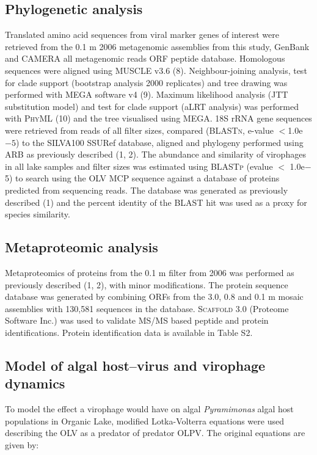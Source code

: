 \subsection{Phylogenetic analysis}
Translated amino acid sequences from viral marker genes of interest were retrieved from the 0.1 \textmu{}m 2006 metagenomic assemblies from this study, GenBank and \ac{CAMERA} all metagenomic reads \ac{ORF} peptide database. 
Homologous sequences were aligned using \textsc{MUSCLE} v3.6 (8). 
Neighbour-joining analysis, test for clade support (bootstrap analysis 2000 replicates) and tree drawing was performed with \ac{MEGA} software v4 (9). 
Maximum likelihood analysis (\textsc{JTT} substitution model) and test for clade support (aLRT analysis) was performed with \textsc{PhyML} (10) and the tree visualised using \ac{MEGA}. 
18S \ac{rRNA} gene sequences were retrieved from reads of all filter sizes, compared (\textsc{BLASTn}, e-value $<$1.0e$-5$) to the \textsc{SILVA100} SSURef database, aligned and phylogeny performed using \textsc{ARB} as previously described (1, 2). 
The abundance and similarity of virophages in all lake samples and filter sizes was estimated using \textsc{BLASTp} (evalue $<$ 1.0e$-$5) to search using the \ac{OLV} \ac{MCP} sequence against a database of proteins predicted from sequencing reads. 
The database was generated as previously described (1) and the percent identity of the \textsc{BLAST} hit was used as a proxy for species similarity. 

\subsection{Metaproteomic analysis}
Metaproteomics of proteins from the 0.1 \textmu{}m filter from 2006 was performed as previously described (1, 2), with minor modifications. 
The protein sequence database was generated by combining ORFs from the 3.0, 0.8 and 0.1 \textmu{}m mosaic assemblies with 130,581 sequences in the database. 
\textsc{Scaffold} 3.0 (Proteome Software Inc.) was used to validate MS/MS based peptide and protein identifications. 
Protein identification data is available in Table S2. 

\subsection[Algal Host--Virus and Virophage Dynamics]{Model of algal host--virus and virophage dynamics}
To model the effect a virophage would have on algal \emph{Pyramimonas} algal host populations in Organic Lake, modified Lotka-Volterra equations were used describing the \ac{OLV} as a predator of predator \ac{OLPV}. 
The original equations are given by:

